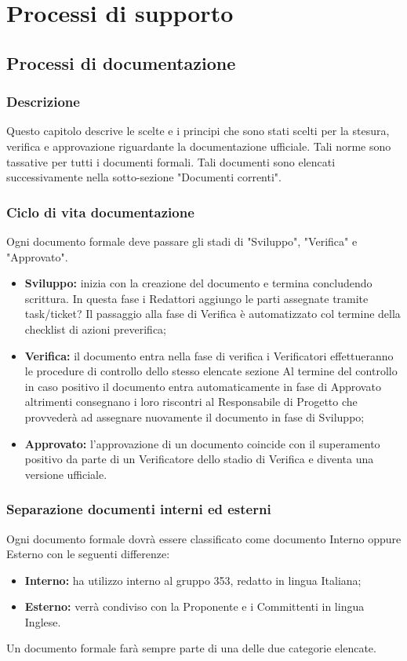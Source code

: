 \documentclass[NormeDiProgetto.tex]{subfiles}
\begin{document}
	
	\chapter{Processi di supporto}
	
	\section{Processi di documentazione}
	\subsection{Descrizione}
	Questo capitolo descrive le scelte e i principi che sono stati scelti per la
	stesura, verifica e approvazione riguardante la documentazione ufficiale.
	Tali norme sono tassative per tutti i documenti formali.
	Tali documenti sono elencati successivamente nella sotto-sezione "Documenti correnti".
	
	\subsection{Ciclo di vita documentazione}
	Ogni documento formale deve passare gli stadi di "Sviluppo", "Verifica" e "Approvato".
	\begin{itemize}
		\item \textbf{Sviluppo:} inizia con la creazione del documento e termina concludendo scrittura. In questa fase i Redattori aggiungo le parti assegnate tramite task/ticket? %
		Il passaggio alla fase di Verifica è automatizzato col termine della checklist di azioni pre\textunderscore verifica;
		
		\item \textbf{Verifica:} il documento entra nella fase di verifica i Verificatori effettueranno le procedure di controllo dello stesso elencate sezione %
		Al termine del controllo in caso positivo il documento entra automaticamente in fase di Approvato altrimenti consegnano i loro riscontri al Responsabile di Progetto che provvederà ad assegnare nuovamente il documento in fase di Sviluppo;
		
		\item \textbf{Approvato:} l'approvazione di un documento coincide con il superamento positivo da parte di un Verificatore dello stadio di Verifica e diventa una versione ufficiale.
	\end{itemize}
	
	\subsection{Separazione documenti interni ed esterni}
	Ogni documento formale dovrà essere classificato come documento Interno
	oppure Esterno con le seguenti differenze:
	\begin{itemize}
		\item \textbf{Interno:} ha utilizzo interno al gruppo 353, redatto in lingua Italiana;
		\item \textbf{Esterno:} verrà condiviso con la Proponente e i Committenti in lingua Inglese.
	\end{itemize}
	Un documento formale farà sempre parte di una delle due categorie elencate.
	
\end{document}
